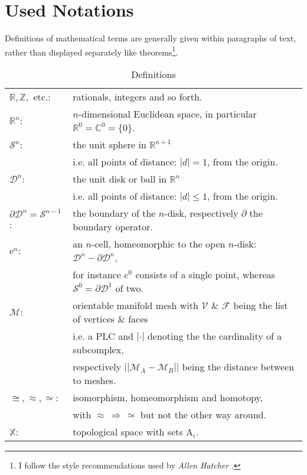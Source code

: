 \section*{Used Notations}
\label{notations}

Definitions of mathematical terms are generally given within paragraphs of text, rather than displayed separately like theorems\footnote[0]{ I follow the style recommendations used by \textit{Allen Hatcher} \citep[cf.][]{Hatcher2002}.}.
\begin{table}[htpb] \medskip
\setlength{\tabcolsep}{5pt}
\renewcommand{\arraystretch}{1.25}
   \label{tab:notations} \caption{Definitions}
\begin{tabular}{ l l }
	$\mathbb{R, Z,}$ etc.: & rationals, integers and so forth.\\
	$\mathbb{R}^{n}$: & $n$-dimensional Euclidean space, in particular $\mathbb{R}^{0} = \mathbb{C}^{0} = \{0\}$.\\
	$\mathcal{S}^{n}$: & the unit sphere in $\mathbb{R}^{n+1}$\\ & i.e. all points of distance: $|d|=1$, from the origin.\\
	$\mathcal{D}^{n}$: & the unit disk or ball in $\mathbb{R}^{n}$\\ & i.e. all points of distance: $|d| \leq 1$, from the origin.\\
	$\partial \mathcal{D}^{n} = \mathcal{S}^{n-1}$: & the boundary of the $n$-disk, respectively $\partial$ the boundary operator.\\
	$\mathrm{e}^{n}$: & an $n$-cell, homeomorphic to the open $n$-disk: $\mathcal{D}^{n} - \partial \mathcal{D}^{n}$,\\ & for instance $e^{0}$ consists of a single point, whereas $\mathcal{S}^{0} = \partial \mathcal{D}^{1}$ of two.\\
	$\mathcal{M}$: & orientable manifold mesh with $\mathcal{V}$ \& $\mathcal{F}$ being the list of vertices \& faces \\ & i.e. a PLC and $|\cdot|$ denoting the the cardinality of a subcomplex, \\ & respectively $||\mathcal{M}_{A} - \mathcal{M}_{B}||$ being the distance between to meshes.\\
	$\cong, \approx, \simeq$: & isomorphism, homeomorphism and homotopy, \\ & with $\approx \, \Rightarrow \, \simeq$ but not the other way around.\\
	$\mathbb{X}$: & topological space with sets $\mathrm{A}_{i}$.\\

\end{tabular}
\end{table}
